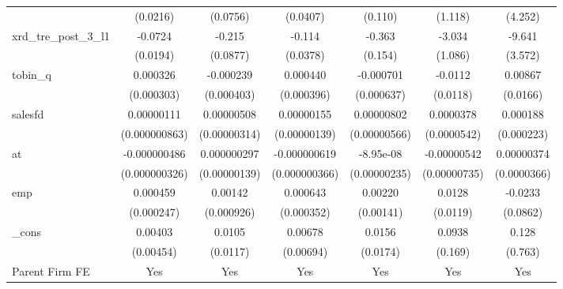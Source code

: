 {\begin{tabular}{l*{6}{c}}
            &    (0.0216)         &    (0.0756)         &    (0.0407)         &     (0.110)         &     (1.118)         &     (4.252)         \\
[1em]
xrd\_tre\_post\_3\_l1&     -0.0724\sym{***}&      -0.215\sym{*}  &      -0.114\sym{**} &      -0.363\sym{*}  &      -3.034\sym{**} &      -9.641\sym{**} \\
            &    (0.0194)         &    (0.0877)         &    (0.0378)         &     (0.154)         &     (1.086)         &     (3.572)         \\
[1em]
tobin\_q     &    0.000326         &   -0.000239         &    0.000440         &   -0.000701         &     -0.0112         &     0.00867         \\
            &  (0.000303)         &  (0.000403)         &  (0.000396)         &  (0.000637)         &    (0.0118)         &    (0.0166)         \\
[1em]
salesfd     &  0.00000111         &  0.00000508         &  0.00000155         &  0.00000802         &   0.0000378         &    0.000188         \\
            &(0.000000863)         &(0.00000314)         &(0.00000139)         &(0.00000566)         & (0.0000542)         &  (0.000223)         \\
[1em]
at          &-0.000000486         & 0.000000297         &-0.000000619         &   -8.95e-08         & -0.00000542         &  0.00000374         \\
            &(0.000000326)         &(0.00000139)         &(0.000000366)         &(0.00000235)         &(0.00000735)         & (0.0000366)         \\
[1em]
emp         &    0.000459         &     0.00142         &    0.000643         &     0.00220         &      0.0128         &     -0.0233         \\
            &  (0.000247)         &  (0.000926)         &  (0.000352)         &   (0.00141)         &    (0.0119)         &    (0.0862)         \\
[1em]
\_cons      &     0.00403         &      0.0105         &     0.00678         &      0.0156         &      0.0938         &       0.128         \\
            &   (0.00454)         &    (0.0117)         &   (0.00694)         &    (0.0174)         &     (0.169)         &     (0.763)         \\
[1em]
Parent Firm FE&         Yes         &         Yes         &         Yes         &         Yes         &         Yes         &         Yes         \\

\end{tabular}}
